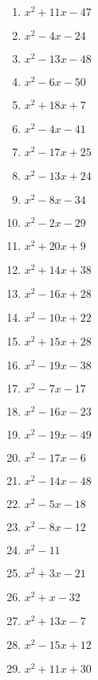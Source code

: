 \documentclass[9pt,dvipdfmx,a4paper]{article}
\begin{document}
\begin{multicols}{2}
\begin{enumerate}
\item
$ x^{2} + 11 x - 47$

\item
$ x^{2} - 4 x - 24$

\item
$ x^{2} - 13 x - 48$

\item
$ x^{2} - 6 x - 50$

\item
$ x^{2} + 18 x + 7$

\item
$ x^{2} - 4 x - 41$

\item
$ x^{2} - 17 x + 25$

\item
$ x^{2} - 13 x + 24$

\item
$ x^{2} - 8 x - 34$

\item
$ x^{2} - 2 x - 29$

\item
$ x^{2} + 20 x + 9$

\item
$ x^{2} + 14 x + 38$

\item
$ x^{2} - 16 x + 28$

\item
$ x^{2} - 10 x + 22$

\item
$ x^{2} + 15 x + 28$

\item
$ x^{2} - 19 x - 38$

\item
$ x^{2} - 7 x - 17$

\item
$ x^{2} - 16 x - 23$

\item
$ x^{2} - 19 x - 49$

\item
$ x^{2} - 17 x - 6$

\item
$ x^{2} - 14 x - 48$

\item
$ x^{2} - 5 x - 18$

\item
$ x^{2} - 8 x - 12$

\item
$ x^{2} - 11$

\item
$ x^{2} + 3 x - 21$

\item
$ x^{2} + x - 32$

\item
$ x^{2} + 13 x - 7$

\item
$ x^{2} - 15 x + 12$

\item
$ x^{2} + 11 x + 30$


\end{enumerate}
\end{multicols}
\end{document}
